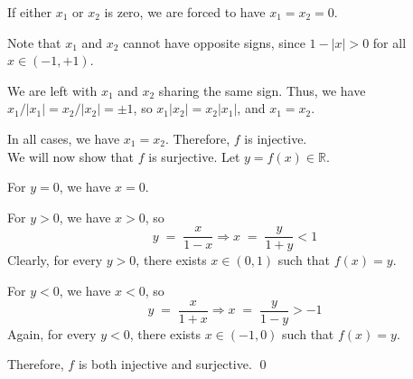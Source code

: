 \documentclass[10pt]{article}
\begin{document}
\begin{enumerate}
                If either $x_1$ or $x_2$ is zero, we are forced to have $x_1 = x_2 = 0$.
                
                Note that $x_1$ and $x_2$ cannot have opposite signs, since $1 - |x| > 0$ for all $x \in (-1,+1)$.

                We are left with $x_1$ and $x_2$ sharing the same sign. Thus, we have $x_1 / |x_1| = x_2 / |x_2| = \pm 1$, so $x_1|x_2| = x_2|x_1|$,
                and $x_1 = x_2$.

                In all cases, we have $x_1 = x_2$. Therefore, $f$ is injective. \\
                
                We will now show that $f$ is surjective. Let $y = f(x) \in \mathbb{R}$.
                
                For $y = 0$, we have $x = 0$.
                
                For $y > 0$, we have $x > 0$, so
                \[
                y \;=\; \frac{x}{1-x} \Rightarrow x \;=\; \frac{y}{1+y} < 1 \tag{$1 + y > y > 0$}
                \]
                Clearly, for every $y > 0$, there exists $x \in (0, 1)$ such that $f(x) = y$.

                For $y < 0$, we have $x < 0$, so
                \[
                y \;=\; \frac{x}{1+x} \Rightarrow x \;=\; \frac{y}{1-y} > -1 \tag{$0 > y > y - 1$}
                \]
                Again, for every $y < 0$, there exists $x \in (-1, 0)$ such that $f(x) = y$.

                Therefore, $f$ is both injective and surjective. \qed

        \end{enumerate} 
\end{document}

